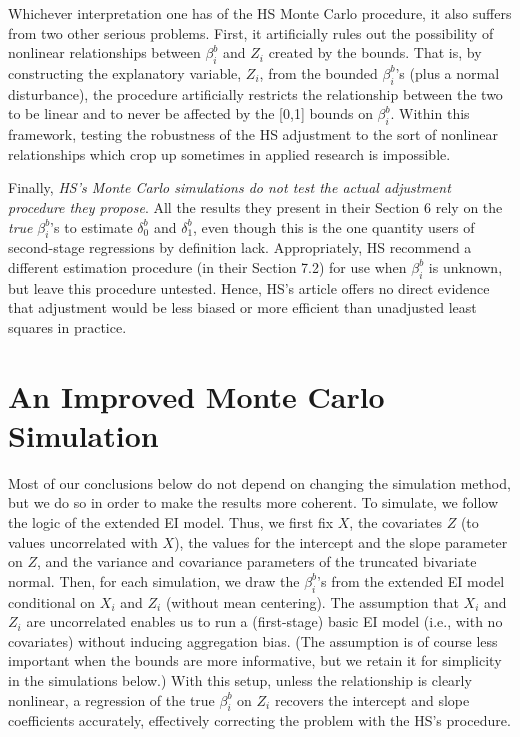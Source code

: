 \documentclass[11pt,titlepage]{article}
\begin{document}
Whichever interpretation one has of the HS Monte Carlo procedure, it
also suffers from two other serious problems.  First, it artificially
rules out the possibility of nonlinear relationships between
$\beta_i^b$ and $Z_i$ created by the bounds.  That is, by constructing
the explanatory variable, $Z_i$, from the bounded $\beta_i^b$'s (plus
a normal disturbance), the procedure artificially restricts the
relationship between the two to be linear and to never be affected by
the [0,1] bounds on $\beta_i^b$.  Within this framework, testing the
robustness of the HS adjustment to the sort of nonlinear relationships
which crop up sometimes in applied research is impossible.

Finally, \emph{HS's Monte Carlo simulations do not test the actual
  adjustment procedure they propose}.  All the results they present in
their Section 6 rely on the \emph{true} $\beta_i^b$'s to estimate
$\delta_0^b$ and $\delta_1^b$, even though this is the one quantity
users of second-stage regressions by definition lack.  Appropriately,
HS recommend a different estimation procedure (in their Section 7.2)
for use when $\beta_i^b$ is unknown, but leave this procedure
untested.  Hence, HS's article offers no direct evidence that
adjustment would be less biased or more efficient than unadjusted
least squares in practice.


\section{An Improved Monte Carlo Simulation} \label{s:alt}

Most of our conclusions below do not depend on changing the simulation
method, but we do so in order to make the results more coherent.  To
simulate, we follow the logic of the extended EI model.  Thus, we
first fix $X$, the covariates $Z$ (to values uncorrelated with $X$),
the values for the intercept and the slope parameter on $Z$, and the
variance and covariance parameters of the truncated bivariate normal.
Then, for each simulation, we draw the $\beta_i^b$'s from the extended
EI model conditional on $X_i$ and $Z_i$ (without mean centering).  The
assumption that $X_i$ and $Z_i$ are uncorrelated enables us to run a
(first-stage) basic EI model (i.e., with no covariates) without
inducing aggregation bias.  (The assumption is of course less
important when the bounds are more informative, but we retain it for
simplicity in the simulations below.)  With this setup, unless the
relationship is clearly nonlinear, a regression of the true
$\beta_i^b$ on $Z_i$ recovers the intercept and slope coefficients
accurately, effectively correcting the problem with the HS's
procedure.
\end{document}
